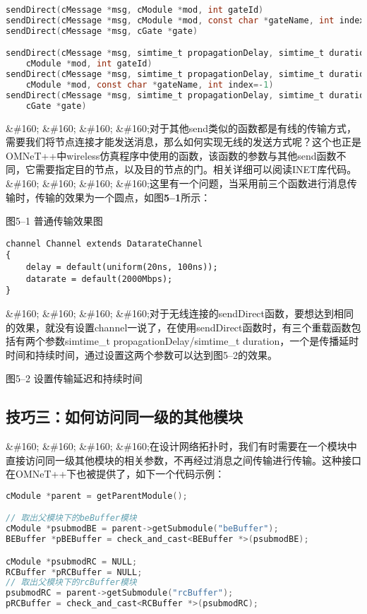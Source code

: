 \begin{lstlisting}[language=c]
sendDirect(cMessage *msg, cModule *mod, int gateId)
sendDirect(cMessage *msg, cModule *mod, const char *gateName, int index=-1)
sendDirect(cMessage *msg, cGate *gate)

sendDirect(cMessage *msg, simtime_t propagationDelay, simtime_t duration,
    cModule *mod, int gateId)
sendDirect(cMessage *msg, simtime_t propagationDelay, simtime_t duration,
    cModule *mod, const char *gateName, int index=-1)
sendDirect(cMessage *msg, simtime_t propagationDelay, simtime_t duration,
    cGate *gate)

\end{lstlisting}

\&\#160; \&\#160; \&\#160; \&\#160;对于其他send类似的函数都是有线的传输方式，需要我们将节点连接才能发送消息，那么如何实现无线的发送方式呢？这个也正是OMNeT++中wireless仿真程序中使用的函数，该函数的参数与其他send函数不同，它需要指定目的节点，以及目的节点的门。相关详细可以阅读INET库代码。
\&\#160; \&\#160; \&\#160; \&\#160;这里有一个问题，当采用前三个函数进行消息传输时，传输的效果为一个圆点，如图\textbf{5--1}所示：

图5--1 普通传输效果图

\begin{verbatim}
channel Channel extends DatarateChannel
{
    delay = default(uniform(20ns, 100ns));
    datarate = default(2000Mbps);
}

\end{verbatim}

\&\#160; \&\#160; \&\#160; \&\#160;对于无线连接的sendDirect函数，要想达到相同的效果，就没有设置channel一说了，在使用sendDirect函数时，有三个重载函数包括有两个参数simtime\_t propagationDelay\slash simtime\_t duration，一个是传播延时时间和持续时间，通过设置这两个参数可以达到图5--2的效果。

图5--2 设置传输延迟和持续时间

\subsection{技巧三：如何访问同一级的其他模块}
\label{技巧三：如何访问同一级的其他模块}

\&\#160; \&\#160; \&\#160; \&\#160;在设计网络拓扑时，我们有时需要在一个模块中直接访问同一级其他模块的相关参数，不再经过消息之间传输进行传输。这种接口在OMNeT++下也被提供了，如下一个代码示例：

\begin{lstlisting}[language=c]
cModule *parent = getParentModule();

// 取出父模块下的beBuffer模块
cModule *psubmodBE = parent->getSubmodule("beBuffer");
BEBuffer *pBEBuffer = check_and_cast<BEBuffer *>(psubmodBE);

cModule *psubmodRC = NULL;
RCBuffer *pRCBuffer = NULL;
// 取出父模块下的rcBuffer模块
psubmodRC = parent->getSubmodule("rcBuffer");
pRCBuffer = check_and_cast<RCBuffer *>(psubmodRC);

\end{lstlisting}

